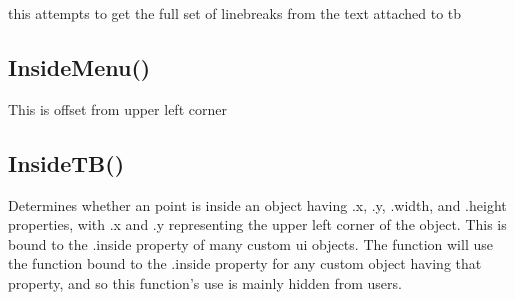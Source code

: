 \documentclass[letterpaper,10pt,english]{sphinxmanual}
\begin{document}
\sphinxAtStartPar
this attempts to get the full set of linebreaks from the
text attached to tb

\sphinxAtStartPar
{}

\begin{sphinxVerbatim}[commandchars=\\\{\}]
\end{sphinxVerbatim}

\ignorespaces 

\subsection{InsideMenu()}
\label{\detokenize{reference/ui:insidemenu}}\label{\detokenize{reference/ui:index-11}}
\sphinxAtStartPar
{}

\sphinxAtStartPar
This is offset from upper left corner

\sphinxAtStartPar
{}

\begin{sphinxVerbatim}[commandchars=\\\{\}]
\end{sphinxVerbatim}

\ignorespaces 

\subsection{InsideTB()}
\label{\detokenize{reference/ui:insidetb}}\label{\detokenize{reference/ui:index-12}}
\sphinxAtStartPar
{}

\sphinxAtStartPar
{}

\sphinxAtStartPar
Determines whether an \sphinxcode{\sphinxupquote{{[}x,y{]}}} point is inside an object having .x, .y, .width, and .height properties, with .x and .y representing the upper left corner of the object.  This is bound to the .inside property of many custom ui objects.  The  function will use the function bound to the .inside property for any custom object having that property, and so this function’s use is mainly hidden from users.
\end{document}
